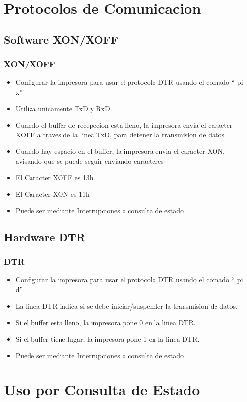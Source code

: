 \documentclass{beamer}
\begin{document}
\section{Protocolos de Comunicacion}
\subsection{Software XON/XOFF}
\begin{frame}[fragile]
\frametitle{XON/XOFF}
\begin{itemize}
 \item Configurar la impresora para usar el protocolo DTR usando el comado `` pi x''
 \item Utiliza unicamente TxD y RxD.
 \item Cuando el buffer de recepecion esta lleno, la impresora envia el caracter XOFF a traves de la linea TxD, para detener la transmision de datos
 \item Cuando hay espacio en el buffer, la impresora envia el caracter XON, avisando que se puede seguir enviando caracteres
 \item El Caracter XOFF es 13h
 \item El Caracter XON es 11h
 \item Puede ser mediante Interrupciones o consulta de estado
\end{itemize}

\end{frame}

\subsection{Hardware DTR}
\begin{frame}[fragile]
\frametitle{DTR}
\begin{itemize}
 \item Configurar la impresora para usar el protocolo DTR usando el comado `` pi d'' 
 \item La linea DTR indica si se debe iniciar/suspender la transmision de datos.
 \item Si el buffer esta lleno, la impresora pone 0 en la linea DTR.
 \item Si el buffer tiene lugar, la impresora pone 1 en la linea DTR.
 \item Puede ser mediante Interrupciones o consulta de estado
\end{itemize}

\end{frame}


\section{Uso por Consulta de Estado}
\end{document}
